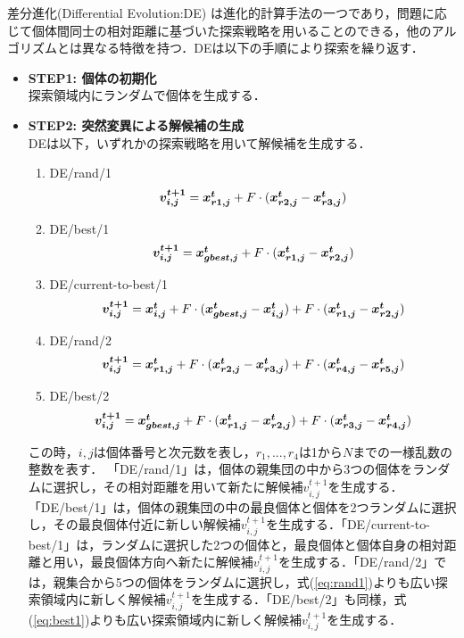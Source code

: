 \documentclass[a4j,11pt]{jarticle}
\begin{document}
差分進化(Differential Evolution:DE) \cite{DE} は進化的計算手法の一つであり，問題に応じて個体間同士の相対距離に基づいた探索戦略を用いることのできる，他のアルゴリズムとは異なる特徴を持つ．DEは以下の手順により探索を繰り返す．
\begin{itemize}
\item {\bf STEP1: 個体の初期化} \\
探索領域内にランダムで個体を生成する．
\item {\bf STEP2: 突然変異による解候補の生成} \\
DEは以下，いずれかの探索戦略を用いて解候補を生成する．
\begin{enumerate}
\item{DE/rand/1}
\begin{equation}
\label{eq:rand1}
\mbox{\boldmath $v_{i,j}^{t+1}$}=\mbox{\boldmath $x_{r1,j}^t$}+F \cdot (\mbox{\boldmath $x_{r2,j}^t$}-\mbox{\boldmath $x_{r3,j}^t$})
\end{equation}
\item{DE/best/1}
\begin{equation}
\label{eq:best1}
\mbox{\boldmath $v_{i,j}^{t+1}$}=\mbox{\boldmath $x_{gbest,j}^t$}+F \cdot (\mbox{\boldmath $x_{r1,j}^t$}-\mbox{\boldmath $x_{r2,j}^t$})
\end{equation}
\item{DE/current-to-best/1}
\begin{equation}
\label{eq:cur2best1}
\mbox{\boldmath $v_{i,j}^{t+1}$}=\mbox{\boldmath $x_{i,j}^t$}+F \cdot (\mbox{\boldmath $x_{gbest,j}^t$}-\mbox{\boldmath $x_{i,j}^t$})+F \cdot (\mbox{\boldmath $x_{r1,j}^t$}-\mbox{\boldmath $x_{r2,j}^t$})
\end{equation}
\item{DE/rand/2}
\begin{equation}
\label{eq:rand2}
\mbox{\boldmath $v_{i,j}^{t+1}$}=\mbox{\boldmath $x_{r1,j}^t$}+F \cdot (\mbox{\boldmath $x_{r2,j}^t$}-\mbox{\boldmath $x_{r3,j}^t$})+F\cdot (\mbox{\boldmath $x_{r4,j}^t$}-\mbox{\boldmath $x_{r5,j}^t$})
\end{equation}
\item{DE/best/2}
\begin{equation}
\label{eq:best2}
\mbox{\boldmath $v_{i,j}^{t+1}$}=\mbox{\boldmath $x_{gbest,j}^t$}+F \cdot (\mbox{\boldmath $x_{r1,j}^t$}-\mbox{\boldmath $x_{r2,j}^t$})+F \cdot (\mbox{\boldmath $x_{r3,j}^t$}-\mbox{\boldmath $x_{r4,j}^t$})
\end{equation}
\end{enumerate}
この時，$i,j$は個体番号と次元数を表し，$r_1,...,r_4$は1から$N$までの一様乱数の整数を表す．
「DE/rand/1」は，個体の親集団の中から3つの個体をランダムに選択し，その相対距離を用いて新たに解候補$v_{i,j}^{t+1}$を生成する．「DE/best/1」は，個体の親集団の中の最良個体と個体を2つランダムに選択し，その最良個体付近に新しい解候補$v_{i,j}^{t+1}$を生成する．「DE/current-to-best/1」は，ランダムに選択した2つの個体と，最良個体と個体自身の相対距離と用い，最良個体方向へ新たに解候補$v_{i,j}^{t+1}$を生成する．「DE/rand/2」では，親集合から5つの個体をランダムに選択し，式(\ref{eq:rand1})よりも広い探索領域内に新しく解候補$v_{i,j}^{t+1}$を生成する．「DE/best/2」も同様，式(\ref{eq:best1})よりも広い探索領域内に新しく解候補$v_{i,j}^{t+1}$を生成する．


\end{itemize}
\end{document}
